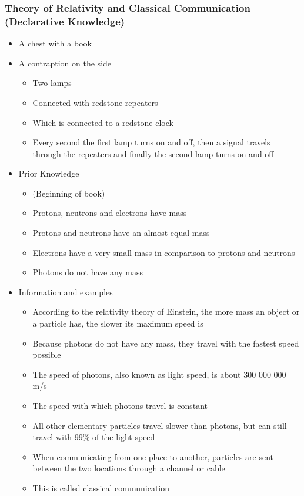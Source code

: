 \documentclass[11pt,twoside]{report} %
\begin{document}
\subsubsection{Theory of Relativity and Classical Communication (Declarative Knowledge)}
\begin{itemize}
	\item A chest with a book
	\item A contraption on the side
	\begin{itemize}
		\item Two lamps
		\item Connected with redstone repeaters
		\item Which is connected to a redstone clock
		\item Every second the first lamp turns on and off, then a signal travels through the repeaters and finally the second lamp turns on and off
	\end{itemize}
	\item Prior Knowledge
	\begin{itemize}
		\item (Beginning of book)
		\item Protons, neutrons and electrons have mass
		\item Protons and neutrons have an almost equal mass
		\item Electrons have a very small mass in comparison to protons and neutrons
		\item Photons do not have any mass
	\end{itemize}
	\item Information and examples
	\begin{itemize}
		\item According to the relativity theory of Einstein, the more mass an object or a particle has, the slower its maximum speed is
		\item Because photons do not have any mass, they travel with the fastest speed possible
		\item The speed of photons, also known as light speed, is about 300 000 000 m/s
		\item The speed with which photons travel is constant
		\item All other elementary particles travel slower than photons, but can still travel with 99\% of the light speed
		\item When communicating from one place to another, particles are sent between the two locations through a channel or cable
		\item This is called classical communication

\end{itemize}
\end{itemize}
\end{document}
